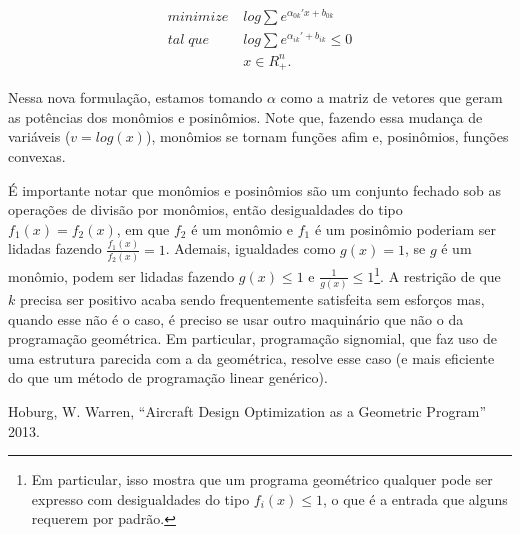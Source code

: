 \documentclass{article}
\begin{document}
\begin{align*}
  minimize \;& log \sum  e^{\alpha_{0k}'x + b_{0k}}\\
  tal\; que\;& log \sum e^{\alpha_{ik}' + b_{ik}} \leq 0\\
             & x \in R^n_{+}.
\end{align*}

Nessa nova formulação, estamos tomando $\alpha$ como a matriz de vetores que geram as potências dos monômios e posinômios. Note que, fazendo
essa mudança de variáveis ($v = log(x)$), monômios se tornam funções afim e, posinômios, funções convexas.

É importante notar que monômios e posinômios são um conjunto fechado sob as operações de divisão por monômios, então desigualdades do tipo $f_1(x) = f_2(x)$, em que $f_2$ é um monômio e $f_1$ é um posinômio poderiam ser lidadas fazendo $\frac{f_1(x)}{f_2(x)} = 1$. Ademais, igualdades como
$g(x) = 1$, se $g$ é um monômio, podem ser lidadas fazendo $g(x) \leq 1$ e $\frac{1}{g(x)} \leq 1$\footnote{Em particular, isso mostra que um programa geométrico qualquer pode ser expresso com desigualdades do tipo $f_i(x) \leq 1$, o que é a entrada que alguns  requerem por padrão.}. A restrição de que $k$ precisa ser positivo acaba sendo frequentemente satisfeita sem esforços mas, quando esse não é o caso, é preciso se usar outro maquinário que não o da programação geométrica. Em particular, programação signomial, que faz uso de uma estrutura parecida com a da geométrica, resolve esse caso (e mais eficiente do que um método de programação linear genérico).



    \begin{thebibliography}{1}

        Hoburg, W. Warren,
        ``Aircraft Design Optimization as a Geometric Program''       
        2013.


     \end{thebibliography}
\end{document}
